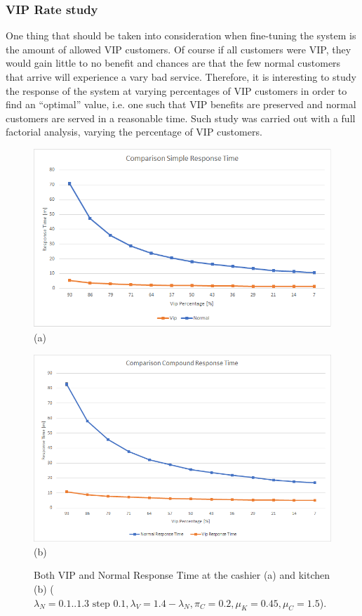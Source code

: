 \subsubsection{VIP Rate study}\label{sec:vip_rate}

One thing that should be taken into consideration when fine-tuning the system is the amount of allowed VIP customers. Of course if all customers were VIP, they would gain little to no benefit and chances are that the few normal customers that arrive will experience a vary bad service. Therefore, it is interesting to study the response of the system at varying percentages of VIP customers in order to find an ``optimal'' value, i.e. one such that VIP benefits are preserved and normal customers are served in a reasonable time. Such study was carried out with a full factorial analysis, varying the percentage of VIP customers.

\begin{figure}[H]
  \begin{minipage}{0.48\textwidth}
    \centering
    \includegraphics[width=\textwidth]{figs/comparisonSimpleResponseTime.png}
    (a)
  \end{minipage}\hspace{0.03\textwidth}
  \begin{minipage}{0.48\textwidth}
    \centering
    \includegraphics[width=\textwidth]{figs/comparisonCompoundResponseTime.png}
    (b)
  \end{minipage}
  \caption{Both VIP and Normal Response Time at the cashier (a) and kitchen (b) ($\lambda_N={{0.1..1.3 \text{ step } 0.1}},\lambda_V=1.4-\lambda_N,\pi_C=0.2, \mu_K=0.45, \mu_C=1.5$).}
  \label{fig:comp_resp_time}
\end{figure}

